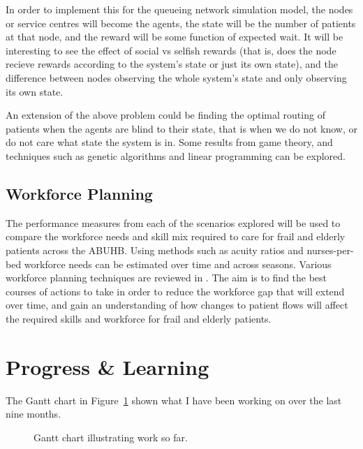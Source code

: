 \documentclass{article}
\begin{document}
In order to implement this for the queueing network simulation model, the nodes or service centres will become the agents, the state will be the number of patients at that node, and the reward will be some function of expected wait.
It will be interesting to see the effect of social vs selfish rewards (that is, does the node recieve rewards according to the system's state or just its own state), and the difference between nodes observing the whole system's state and only observing its own state.

An extension of the above problem could be finding the optimal routing of patients when the agents are blind to their state, that is when we do not know, or do not care what state the system is in.
Some results from game theory, and techniques such as genetic algorithms and linear programming can be explored.

\subsection{Workforce Planning}
The performance measures from each of the scenarios explored will be used to compare the workforce needs and skill mix required to care for frail and elderly patients across the ABUHB.
Using methods such as acuity ratios and nurses-per-bed workforce needs can be estimated over time and across seasons.
Various workforce planning techniques are reviewed in \cite{hurst03}.
The aim is to find the best courses of actions to take in order to reduce the workforce gap that will extend over time, and gain an understanding of how changes to patient flows will affect the required skills and workforce for frail and elderly patients.




\section{Progress \& Learning}

The Gantt chart in Figure~\ref{fig:progressgantt} shown what I have been working on over the last nine months.

\begin{figure}
    
    \caption{Gantt chart illustrating work so far.}
    \label{fig:progressgantt}
\end{figure}
\end{document}
